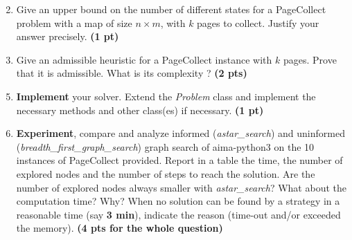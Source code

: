 \documentclass[11pt,a4paper]{report}
\begin{document}
\newpage
\begin{enumerate}
\setcounter{enumi}{1}
\item Give an upper bound on the number of different states for a PageCollect problem
with a map of size $n \times m$, with $k$ pages to collect. Justify your answer precisely. \textbf{(1 pt)}
\end{enumerate}

\begin{answers}[5cm]
\end{answers}



\begin{enumerate}
\setcounter{enumi}{2}
\item Give an admissible heuristic for a PageCollect instance with $k$ pages. Prove
that it is admissible. What is its complexity ?  \textbf{(2 pts)}
\end{enumerate}

\begin{answers}[5cm]
\end{answers}



\begin{enumerate}
\setcounter{enumi}{4}
\item \textbf{Implement} your solver. Extend the \emph{Problem} class and implement 
		the necessary methods and other class(es) if necessary.  \textbf{(1 pt)}
\item \textbf{Experiment}, compare and analyze informed 
		(\emph{astar\_search}) and uninformed\\
		(\emph{breadth\_first\_graph\_search}) graph search of aima-python3 on the 
		10 instances of PageCollect provided.
		Report in a table the time, the number of explored nodes and the number of 
		steps to reach the solution. 
		Are the number of explored nodes always smaller with 
		\emph{astar\_search}? 
		What about the computation time? 
		Why? 
		 When no solution can be found by a strategy in a reasonable time (say \textbf{3 
		 min}), indicate the reason (time-out and/or exceeded the memory). \textbf{(4 pts for the whole question)}
\end{enumerate}

\begin{answers}[8cm]

\end{answers}

~ 
\end{document}
